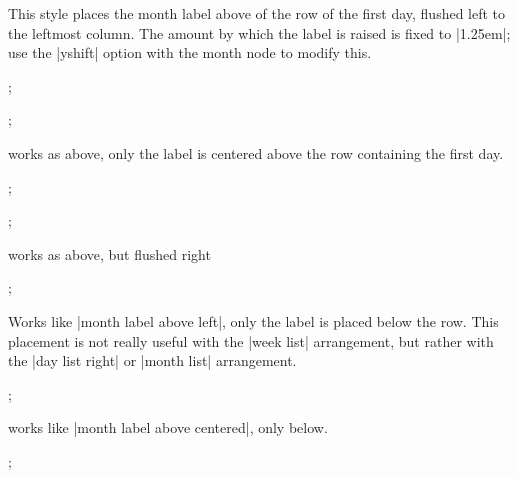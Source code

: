 \begin{itemize}
  This style places the month label above of the row of the first day,
  flushed left to the leftmost column. The amount by which the label
  is raised is fixed to |1.25em|; use the |yshift| option with the
  month node to modify this.
\begin{codeexample}[]
\tikz
  \calendar [dates=2000-01-28 to 2000-02-03,
             day list right,month xshift=1em,
             month label above left];
\end{codeexample}
\begin{codeexample}[]
\tikz
  \calendar [dates=2000-01-20 to 2000-02-10,
             week list,month label above left];
\end{codeexample}
  
  works as above, only the label is centered above the row containing
  the first day.
\begin{codeexample}[]
\tikz
  \calendar [dates=2000-02-01 to 2000-02-last,
             day list right,month label above centered];
\end{codeexample}
\begin{codeexample}[]
\tikz
  \calendar [dates=2000-01-20 to 2000-02-10,
             week list,month label above centered];
\end{codeexample}
   
  works as above, but flushed right
\begin{codeexample}[]
\tikz
  \calendar [dates=2000-01-20 to 2000-02-10,
             week list,month label above right];
\end{codeexample}

  Works like |month label above left|, only the label is placed below
  the row. This placement is not really useful with the |week list|
  arrangement, but rather with the |day list right| or |month list|
  arrangement.
\begin{codeexample}[]
\tikz
  \calendar [dates=2000-02-01 to 2000-02-last,
             day list right,month label below left];
\end{codeexample}
  works like |month label above centered|, only below.
\begin{codeexample}[]
\tikz
  \calendar [dates=2000-02-01 to 2000-02-last,
             day list right,month label below centered];
\end{codeexample}
\end{itemize}



